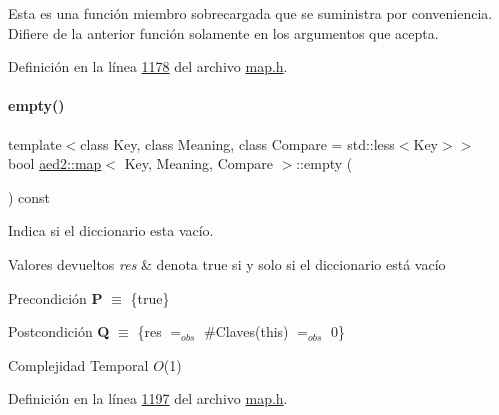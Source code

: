Esta es una función miembro sobrecargada que se suministra por conveniencia. Difiere de la anterior función solamente en los argumentos que acepta. 

Definición en la línea \hyperlink{map_8h_source_l01178}{1178} del archivo \hyperlink{map_8h_source}{map.\+h}.

\mbox{\label{classaed2_1_1map_a0dcb39283f4877ae59cb756ed1d0c048_a0dcb39283f4877ae59cb756ed1d0c048}} 
\paragraph{\texorpdfstring{empty()}{empty()}}
{\footnotesize\ttfamily template$<$class Key, class Meaning, class Compare = std\+::less$<$\+Key$>$$>$ \\
bool \hyperlink{classaed2_1_1map}{aed2\+::map}$<$ Key, Meaning, Compare $>$\+::empty (\begin{DoxyParamCaption}{ }\end{DoxyParamCaption}) const\hspace{0.3cm}{\ttfamily [inline]}}



Indica si el diccionario esta vacío. 


\begin{DoxyRetVals}{Valores devueltos}
{\em res} & denota true si y solo si el diccionario está vacío\\
\hline
\end{DoxyRetVals}
\begin{DoxyPrecond}{Precondición}
{\bfseries P} $\equiv$ \{true\} 
\end{DoxyPrecond}
\begin{DoxyPostcond}{Postcondición}
{\bfseries Q} $\equiv$ \{res $=_{obs}$ \#Claves(this) $=_{obs}$ 0\}
\end{DoxyPostcond}

\begin{DoxyDescription}
\item[Complejidad Temporal]$O$(1)
\end{DoxyDescription}

Definición en la línea \hyperlink{map_8h_source_l01197}{1197} del archivo \hyperlink{map_8h_source}{map.\+h}.

\mbox{\label{classaed2_1_1map_aa6e806b3be6dc0da79adbfae08b571bf_aa6e806b3be6dc0da79adbfae08b571bf}} 
